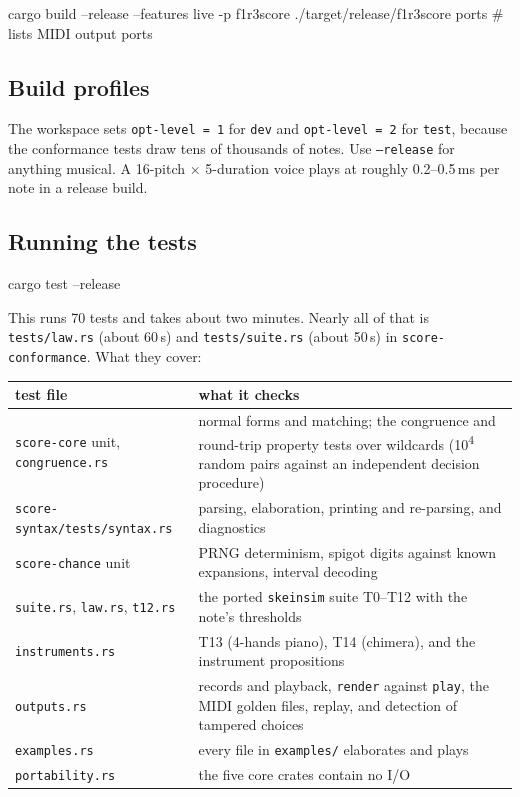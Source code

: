 \documentclass[11pt,a4paper]{article}
\newcommand{\ttx}[1]{\texttt{#1}}
\begin{document}
\begin{shell}
cargo build --release --features live -p f1r3score
./target/release/f1r3score ports     # lists MIDI output ports
\end{shell}

\subsection{Build profiles}

The workspace sets \ttx{opt-level = 1} for \ttx{dev} and \ttx{opt-level = 2}
for \ttx{test}, because the conformance tests draw tens of thousands of notes.
Use \ttx{--release} for anything musical. A 16-pitch $\times$ 5-duration voice
plays at roughly 0.2--0.5\,ms per note in a release build.

\subsection{Running the tests}

\begin{shell}
cargo test --release
\end{shell}

\noindent This runs 70 tests and takes about two minutes. Nearly all of that is
\ttx{tests/law.rs} (about 60\,s) and \ttx{tests/suite.rs} (about 50\,s) in
\ttx{score-conformance}. What they cover:

\begin{center}
\small
\begin{tabularx}{\linewidth}{@{}l>{\raggedright\arraybackslash}X@{}}
\toprule
test file & what it checks \\
\midrule
\ttx{score-core} unit, \ttx{congruence.rs} & normal forms and matching; the
  congruence and round-trip property tests over wildcards (10\textsuperscript{4}
  random pairs against an independent decision procedure) \\
\ttx{score-syntax/tests/syntax.rs} & parsing, elaboration, printing and
  re-parsing, and diagnostics \\
\ttx{score-chance} unit & PRNG determinism, spigot digits against known
  expansions, interval decoding \\
\ttx{suite.rs}, \ttx{law.rs}, \ttx{t12.rs} & the ported \ttx{skeinsim} suite
  T0--T12 with the note's thresholds \\
\ttx{instruments.rs} & T13 (4-hands piano), T14 (chimera), and the instrument
  propositions \\
\ttx{outputs.rs} & records and playback, \ttx{render} against \ttx{play}, the
  MIDI golden files, replay, and detection of tampered choices \\
\ttx{examples.rs} & every file in \ttx{examples/} elaborates and plays \\
\ttx{portability.rs} & the five core crates contain no I/O \\
\bottomrule
\end{tabularx}
\end{center}
\end{document}
